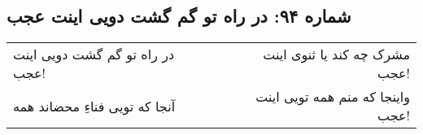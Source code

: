 \begin{center}
\section*{شماره ۹۴: در راه تو گم گشت دویی اینت عجب}
\label{sec:094}
\begin{longtable}{l p{0.5cm} r}
در راه تو گم گشت دویی اینت عجب!
&&
مشرک چه کند یا ثنوی اینت عجب!
\\
آنجا که تویی فناءِ محضاند همه
&&
واینجا که منم همه تویی اینت عجب!
\\
\end{longtable}
\end{center}
